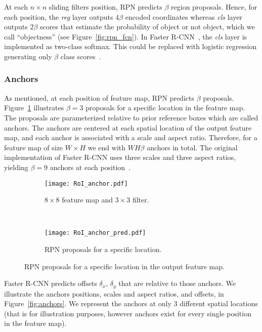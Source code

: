%
At each $n\times n$ sliding filters position, RPN predicts $\beta$ region proposals.
Hence, for each position, the {\it reg} layer outputs $4\beta$ encoded coordinates whereas {\it cls} layer outputs $2\beta$ scores that estimate the probability of object or not object, which we call ``objectness'' (see Figure~\ref{fig:rpn_fcn}).
In Faster R-CNN~\cite{Ren2017fasterpami}, the {\it cls} layer is implemented as two-class softmax.
This could be replaced with logistic regression generating only $\beta$ class scores~\cite{Ren2017fasterpami}.


\subsubsection{Anchors}


As mentioned, at each position of feature map, RPN predicts $\beta$ proposals.
Figure~\ref{fig:rpn_pred} illustrates $\beta=3$ proposals for a specific location in the feature map.
The proposals are parameterized relative to prior reference boxes which are called anchors.
The anchors are centered at each spatial location of the output feature map, and each anchor is associated with a scale and aspect ratio.
Therefore, for a feature map of size $W\times H$ we end with $WH\beta$ anchors in total.
The original implementation of Faster R-CNN uses three scales and three aspect ratios, yielding $\beta=9$ anchors at each position~\cite{Ren2017fasterpami}.
%
%
\begin{figure}[th!]
  \centering
  \begin{subfigure}[t]{0.49\linewidth}
    \centering
    \texttt{[image: RoI\_anchor.pdf]}
    \caption{$8\times 8$ feature map and $3\times3$ filter.}
  \end{subfigure}~
  \begin{subfigure}[t]{0.49\linewidth}
    \centering
    \texttt{[image: RoI\_anchor\_pred.pdf]}
    \caption{RPN proposals for a specific location.}
  \end{subfigure}
  \caption{RPN proposals for a specific location in the output feature map.}
  \label{fig:rpn_pred}
\end{figure}
%
Faster R-CNN predicts offsets $\delta_x$, $\delta_y$ that are relative to those anchors.
We illustrate the anchors positions, scales and aspect ratios, and offsets, in Figure~\ref{fig:anchors}.
We represent the anchors at only 3 different spatial locations (that is for illustration purposes, however anchors exist for every single position in the feature map).
